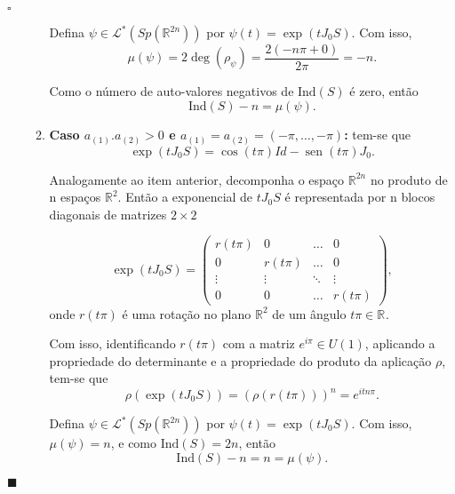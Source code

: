 \documentclass[12pt]{book}
\newenvironment{prova}[1]{$\square$ #1}{\hfill$\blacksquare$}
\DeclareMathOperator{\sen}{sen}
\newcommand{\caminhosespeciais}[1]{\mathcal{L}^{*}(#1)}
\newcommand{\estruturacomplexa}{J_{0}}
\newcommand{\gruposimpletico}[1]{Sp(#1)}
\newcommand{\ind}{\text{Ind}}
\newcommand{\real}[1]{\mathbb{R}^{#1}}
\newcommand{\reta}{\real{}}
\begin{document}
\begin{prova}
\begin{enumerate}
\begin{enumerate}
				Defina $\psi \in \caminhosespeciais{\gruposimpletico{\real{2n}}}$ por $\psi(t) = \exp(t\estruturacomplexa S)$. Com isso, 
				$$
				\mu(\psi) = 2\deg(\rho_{\psi}) = \frac{2(-n\pi +0)}{2\pi}=-n.
				$$
				
				Como o número de auto-valores negativos de $\ind(S)$ é zero, então  
				$$
				\ind(S)-n=\mu(\psi).
				$$
				
				\item \textbf{Caso $a_{(1)}.a_{(2)}>0$ e $a_{(1)} = a_{(2)} = (-\pi,\dots,-\pi)$:} tem-se que
				$$
				\exp(t\estruturacomplexa S) = \cos(t\pi)Id- \sen(t\pi)\estruturacomplexa.
				$$
				
				Analogamente ao item anterior, 	decomponha o espaço $\real{2n}$ no produto de n espaços $\real{2}$. Então a exponencial de $t\estruturacomplexa S$ é representada por n blocos diagonais de matrizes $2\times 2$
				
				$$
				\exp(t\estruturacomplexa S) =
				\left(
				\begin{array}{ccccc}
				r(t\pi) & 0 &\dots & 0 
				\\
				0 & r(t\pi) &\dots & 0 
				\\
				\vdots & \vdots & \ddots & \vdots 
				\\
				0 & 0 & \dots & r(t\pi)
				\end{array}
				\right),
				$$
				onde $r(t\pi)$ é uma rotação no plano $\real{2}$ de um ângulo $t\pi\in \reta$.
				
				Com isso, identificando $r(t\pi)$ com a matriz $e^{i\pi }\in U(1)$, aplicando a propriedade do determinante e a propriedade do produto da aplicação $\rho$, tem-se que 
				$$
				\rho(\exp(t\estruturacomplexa S)) = (\rho(r(t\pi)))^{n} = e^{itn\pi}.
				$$
				
				
				Defina $\psi \in \caminhosespeciais{\gruposimpletico{\real{2n}}}$ por $\psi(t) = \exp(t\estruturacomplexa S)$. Com isso, $\mu(\psi) = n $, e como $\ind(S) = 2n$, então 
				$$ 
				\ind(S)-n = n = \mu(\psi).
				$$
				

\end{enumerate}
\end{enumerate}
\end{prova}
\end{document}
